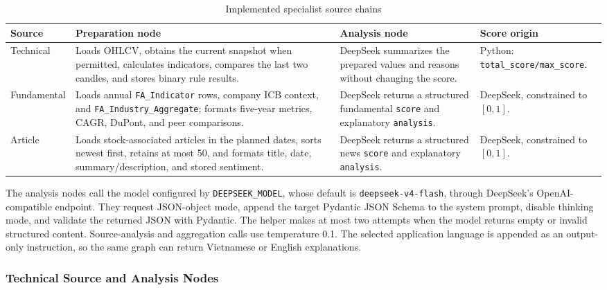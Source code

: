 \begin{table}[H]
    \centering
    \caption{Implemented specialist source chains}
    \label{tab:specialist-node-responsibilities}
    \footnotesize
    \setlength{\tabcolsep}{4pt}
    \renewcommand{\arraystretch}{1.18}
    \begin{tabular}{p{2.2cm} p{4.3cm} p{4.4cm} p{2.5cm}}
        \toprule
        \textbf{Source} & \textbf{Preparation node} & \textbf{Analysis node} & \textbf{Score origin} \\
        \midrule
        Technical & Loads OHLCV, obtains the current snapshot when permitted, calculates indicators, compares the last two candles, and stores binary rule results. & DeepSeek summarizes the prepared values and reasons without changing the score. & Python: \texttt{total\_score/max\_score}. \\
        Fundamental & Loads annual \texttt{FA\_Indicator} rows, company ICB context, and \texttt{FA\_Industry\_Aggregate}; formats five-year metrics, CAGR, DuPont, and peer comparisons. & DeepSeek returns a structured fundamental \texttt{score} and explanatory \texttt{analysis}. & DeepSeek, constrained to $[0,1]$. \\
        Article & Loads stock-associated articles in the planned dates, sorts newest first, retains at most 50, and formats title, date, summary/description, and stored sentiment. & DeepSeek returns a structured news \texttt{score} and explanatory \texttt{analysis}. & DeepSeek, constrained to $[0,1]$. \\
        \bottomrule
    \end{tabular}
\end{table}

The analysis nodes call the model configured by \texttt{DEEPSEEK\_MODEL}, whose default is \texttt{deepseek-v4-flash}, through DeepSeek's OpenAI-compatible endpoint. They request JSON-object mode, append the target Pydantic JSON Schema to the system prompt, disable thinking mode, and validate the returned JSON with Pydantic. The helper makes at most two attempts when the model returns empty or invalid structured content. Source-analysis and aggregation calls use temperature 0.1. The selected application language is appended as an output-only instruction, so the same graph can return Vietnamese or English explanations.

\subsubsection{Technical Source and Analysis Nodes}
\label{subsubsec:technical-analysis-node}

